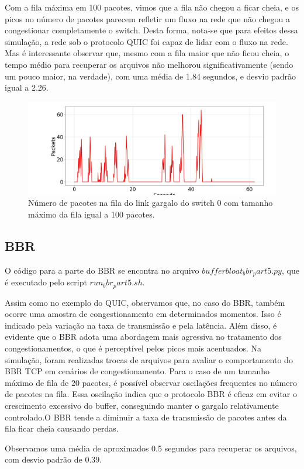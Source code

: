 \documentclass[a4paper,12pt]{article}
\begin{document}
Com a fila máxima em 100 pacotes, vimos que a fila não chegou a ficar cheia, e os picos no número de pacotes parecem refletir um fluxo na rede que não chegou a congestionar completamente o switch. Desta forma, nota-se que para efeitos dessa simulação, a rede sob o protocolo QUIC foi capaz de lidar com o fluxo na rede. Mas é interessante observar que, mesmo com a fila maior que não ficou cheia, o tempo médio para recuperar os arquivos não melhorou significativamente (sendo um pouco maior, na verdade), com uma média de 1.84 segundos, e desvio padrão igual a 2.26.

\begin{figure}[ht!]
  \centering
  \includegraphics[width=0.5\columnwidth]{./bufferbloat/bb-q100/quic-part5-buffer-q100.jpg}
  \caption{Número de pacotes na fila do link gargalo do switch 0 com tamanho máximo da fila igual a 100 pacotes.}
\end{figure}

\subsection{BBR}

O código para a parte do BBR se encontra no arquivo $bufferbloat_bbr_part5.py$, que é executado pelo script $run_bbr_part5.sh$.

Assim como no exemplo do QUIC, observamos que, no caso do BBR, também ocorre uma amostra de congestionamento em determinados momentos. Isso é indicado pela variação na taxa de transmissão e pela latência. Além disso, é evidente que o BBR adota uma abordagem mais agressiva no tratamento dos congestionamentos, o que é perceptível pelos picos mais acentuados. 
Na simulação, foram realizadas trocas de arquivos para avaliar o comportamento do BBR TCP em cenários de congestionamento. Para o caso de um tamanho máximo de fila de 20 pacotes, é possível observar oscilações frequentes no número de pacotes na fila. Essa oscilação indica que o protocolo BBR é eficaz em evitar o crescimento excessivo do buffer, conseguindo manter o gargalo relativamente controlado.O BBR tende a diminuir a taxa de transmissão de pacotes antes da fila ficar cheia causando perdas.

Observamos uma média de aproximados 0.5 segundos para recuperar os arquivos, com desvio padrão de 0.39.
\end{document}
